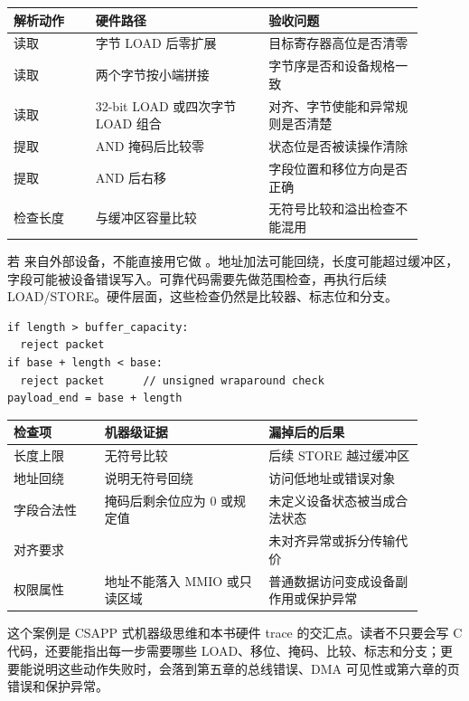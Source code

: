 \begin{longtable}{L{0.18\linewidth}L{0.38\linewidth}L{0.34\linewidth}}
\toprule
解析动作 & 硬件路径 & 验收问题 \\
\midrule
读取  & 字节 LOAD 后零扩展 & 目标寄存器高位是否清零 \\
读取  & 两个字节按小端拼接 & 字节序是否和设备规格一致 \\
读取  & 32-bit LOAD 或四次字节 LOAD 组合 & 对齐、字节使能和异常规则是否清楚 \\
提取  & AND 掩码后比较零 & 状态位是否被读操作清除 \\
提取  & AND 后右移 & 字段位置和移位方向是否正确 \\
检查长度 & 与缓冲区容量比较 & 无符号比较和溢出检查不能混用 \\
\bottomrule
\end{longtable}

若  来自外部设备，不能直接用它做 。地址加法可能回绕，长度可能超过缓冲区，字段可能被设备错误写入。可靠代码需要先做范围检查，再执行后续 LOAD/STORE。硬件层面，这些检查仍然是比较器、标志位和分支。

\begin{lstlisting}
if length > buffer_capacity:
  reject packet
if base + length < base:
  reject packet      // unsigned wraparound check
payload_end = base + length
\end{lstlisting}

\begin{longtable}{L{0.2\linewidth}L{0.36\linewidth}L{0.34\linewidth}}
\toprule
检查项 & 机器级证据 & 漏掉后的后果 \\
\midrule
长度上限 & 无符号比较  & 后续 STORE 越过缓冲区 \\
地址回绕 &  说明无符号回绕 & 访问低地址或错误对象 \\
字段合法性 & 掩码后剩余位应为 0 或规定值 & 未定义设备状态被当成合法状态 \\
对齐要求 &  & 未对齐异常或拆分传输代价 \\
权限属性 & 地址不能落入 MMIO 或只读区域 & 普通数据访问变成设备副作用或保护异常 \\
\bottomrule
\end{longtable}

这个案例是 CSAPP 式机器级思维和本书硬件 trace 的交汇点。读者不只要会写 C 代码，还要能指出每一步需要哪些 LOAD、移位、掩码、比较、标志和分支；更要能说明这些动作失败时，会落到第五章的总线错误、DMA 可见性或第六章的页错误和保护异常。

